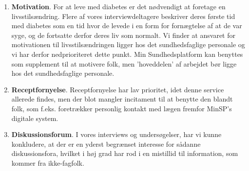 \begin{enumerate}
	\item \textbf{Motivation}. For at leve med diabetes er det nødvendigt at foretage en livsstilsændring. Flere af vores interviewdeltagere beskriver deres første tid med diabetes som en tid hvor de levede i en form for fornægtelse af at de var syge, og de fortsatte derfor deres liv som normalt. Vi finder at ansvaret for motivationen til livsstilsændringen ligger hos det sundhedsfaglige personale og vi har derfor nedprioriteret dette punkt. Min Sundhedsplatform kan benyttes som supplement til at motivere folk, men 'hoveddelen' af arbejdet bør ligge hos det sundhedsfaglige personale.
	\item \textbf{Receptfornyelse}. Receptfornyelse har lav prioritet, idet denne service allerede findes, men der blot mangler incitament til at benytte den blandt folk, som f.eks. foretrækker personlig kontakt med lægen fremfor MinSP's digitale system.
	\item \textbf{Diskussionsforum}. I vores interviews og undersøgelser, har vi kunne konkludere, at der er en yderst begrænset interesse for sådanne diskussionsfora, hvilket i høj grad har rod i en mistillid til information, som kommer fra ikke-fagfolk.
\end{enumerate}
